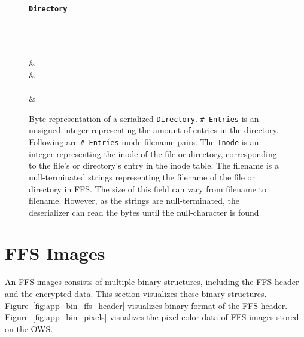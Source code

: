 \begin{figure}[!htb]
	\label{fig:app_bin_dir}
	\centering
    \textbf{\texttt{Directory}}\par\medskip

	\begin{bytefield}[bitwidth=0.0625\textwidth]{16}
		 \\
		 \\
		 \\
		 & \\
		 & \\
		 \\[1ex]
		 & \\
	\end{bytefield}
	\caption[Byte representation of the serialization of an \texttt{Directory} object]{Byte representation of a serialized \texttt{Directory}. \texttt{\#~Entries} is an unsigned integer representing the amount of entries in the directory. Following are \texttt{\#~Entries} inode-filename pairs. The \texttt{Inode} is an integer representing the inode of the file or directory, corresponding to the file's or directory's entry in the inode table. The filename is a null-terminated strings representing the filename of the file or directory in FFS. The size of this field can vary from filename to filename. However, as the strings are null-terminated, the deserializer can read the bytes until the null-character is found}
\end{figure}

\section{FFS Images}
An FFS images consists of multiple binary structures, including the FFS header and the encrypted data. This section visualizes these binary structures. Figure~\ref{fig:app_bin_ffs_header} visualizes binary format of the FFS header. Figure~\ref{fig:app_bin_pixels} visualizes the pixel color data of FFS images stored on the OWS.

